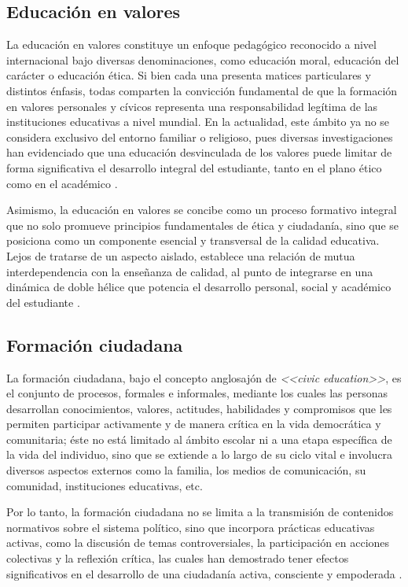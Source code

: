 \subsection{Educación en valores}
La educación en valores constituye un enfoque pedagógico reconocido a nivel
internacional bajo diversas denominaciones, como educación moral, educación del
carácter o educación ética. Si bien cada una presenta matices particulares y
distintos énfasis, todas comparten la convicción fundamental de que la
formación en valores personales y cívicos representa una responsabilidad
legítima de las instituciones educativas a nivel mundial. En la actualidad,
este ámbito ya no se considera exclusivo del entorno familiar o religioso, pues
diversas investigaciones han evidenciado que una educación desvinculada de los
valores puede limitar de forma significativa el desarrollo integral del
estudiante, tanto en el plano ético como en el académico
\cite{lovat2009values}.

Asimismo, la educación en valores se concibe como un proceso formativo integral
que no solo promueve principios fundamentales de ética y ciudadanía, sino que
se posiciona como un componente esencial y transversal de la calidad educativa.
Lejos de tratarse de un aspecto aislado, establece una relación de mutua
interdependencia con la enseñanza de calidad, al punto de integrarse en una
dinámica de doble hélice que potencia el desarrollo personal, social y
académico del estudiante \cite{lovat2009values}.

\subsection{Formación ciudadana}
La formación ciudadana, bajo el concepto anglosajón de \textit{<<civic
    education>>}, es el conjunto de procesos, formales e informales, mediante los
cuales las personas desarrollan conocimientos, valores, actitudes, habilidades
y compromisos que les permiten participar activamente y de manera crítica en la
vida democrática y comunitaria; éste no está limitado al ámbito escolar ni a
una etapa específica de la vida del individuo, sino que se extiende a lo largo
de su ciclo vital e involucra diversos aspectos externos como la familia, los
medios de comunicación, su comunidad, instituciones educativas, etc.
\cite{crittenden2007civic}

Por lo tanto, la formación ciudadana no se limita a la transmisión de
contenidos normativos sobre el sistema político, sino que incorpora prácticas
educativas activas, como la discusión de temas controversiales, la
participación en acciones colectivas y la reflexión crítica, las cuales han
demostrado tener efectos significativos en el desarrollo de una ciudadanía
activa, consciente y empoderada \cite{crittenden2007civic}.


